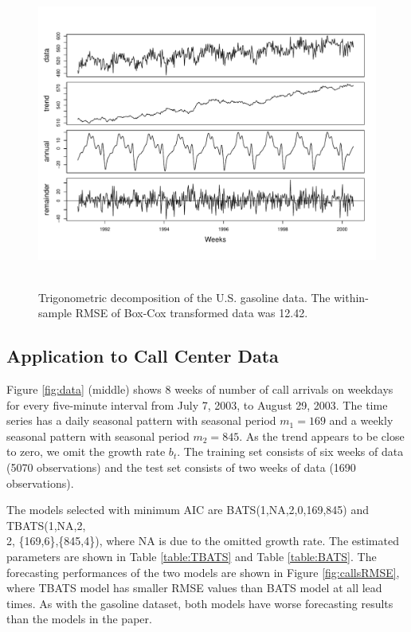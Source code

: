 \documentclass{uwstat572}
\begin{document}
\begin{figure}[]
\centering
  \includegraphics[width=\linewidth,height=4in]{tbatsDecompGas.pdf}
  \caption{Trigonometric decomposition of the U.S. gasoline data. The within-sample RMSE of Box-Cox transformed data was 12.42.}
  \label{fig:tbatsDecompGas}
\end{figure}


\subsection{Application to Call Center Data}
\hspace{4ex}Figure \ref{fig:data} (middle) shows 8 weeks of number of call arrivals on weekdays for every five-minute interval from July 7, 2003, to August 29, 2003. The time series has a daily seasonal pattern with seasonal period $m_1=169$ and a weekly seasonal pattern with seasonal period $m_2=845$. As the trend appears to be close to zero, we omit the growth rate $b_t$. The training set consists of six weeks of data (5070 observations) and the test set consists of two weeks of data (1690 observations). 

The models selected with minimum AIC are BATS(1,NA,2,0,169,845) and TBATS(1,NA,2,\\2, \{169,6\},\{845,4\}), where NA is due to the omitted growth rate. The estimated parameters are shown in Table \ref{table:TBATS} and Table \ref{table:BATS}. The forecasting performances of the two models are shown in Figure \ref{fig:callsRMSE}, where TBATS model has smaller RMSE values than BATS model at all lead times. As with the gasoline dataset, both models have worse forecasting results than the models in the paper.
\end{document}
